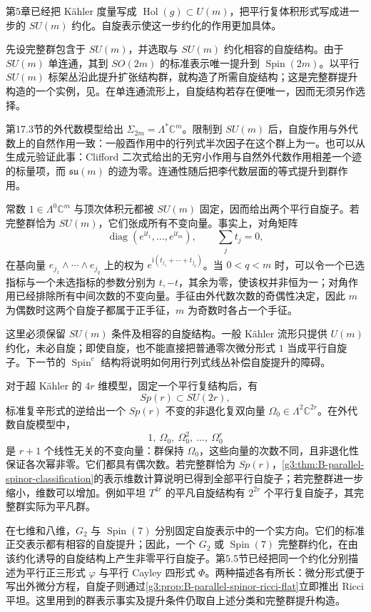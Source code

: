 第5章已经把 Kähler 度量写成 \(\operatorname{Hol}(g)\subset U(m)\)，把平行复体积形式写成进一步的 \(SU(m)\) 约化。自旋表示使这一步约化的作用更加具体。

先设完整群包含于 \(SU(m)\)，并选取与 \(SU(m)\) 约化相容的自旋结构。由于 \(SU(m)\) 单连通，其到 \(SO(2m)\) 的标准表示唯一提升到 \(\operatorname{Spin}(2m)\)。以平行 \(SU(m)\) 标架丛沿此提升扩张结构群，就构造了所需自旋结构；这是完整群提升构造的一个实例，见\cite[作者版本第5页，引理5]{MoroianuSemmelmann2000ParallelSpinors}。在单连通流形上，自旋结构若存在便唯一，因而无须另作选择。

第17.3节的外代数模型给出 \(\Sigma_{2m}=\Lambda^*\mathbb C^m\)。限制到 \(SU(m)\) 后，自旋作用与外代数上的自然作用一致：一般酉作用中的行列式半次因子在这个群上为一。也可以从生成元验证此事：Clifford 二次式给出的无穷小作用与自然外代数作用相差一个迹的标量项，而 \(\mathfrak{su}(m)\) 的迹为零。连通性随后把李代数层面的等式提升到群作用。

常数 \(1\in\Lambda^0\mathbb C^m\) 与顶次体积元都被 \(SU(m)\) 固定，因而给出两个平行自旋子。若完整群恰为 \(SU(m)\)，它们张成所有不变向量。事实上，对角矩阵
\[
 \operatorname{diag}(e^{\mathrm it_1},\ldots,e^{\mathrm it_m}),
 \qquad \sum_jt_j=0,
\]
在基向量 \(e_{j_1}\wedge\cdots\wedge e_{j_q}\) 上的权为 \(e^{\mathrm i(t_{j_1}+\cdots+t_{j_q})}\)。当 \(0<q<m\) 时，可以令一个已选指标与一个未选指标的参数分别为 \(t,-t\)，其余为零，使该权并非恒为一；对角作用已经排除所有中间次数的不变向量。手征由外代数次数的奇偶性决定，因此 \(m\) 为偶数时这两个自旋子都属于正手征，\(m\) 为奇数时各占一个手征。

这里必须保留 \(SU(m)\) 条件及相容的自旋结构。一般 Kähler 流形只提供 \(U(m)\) 约化，未必自旋；即使自旋，也不能直接把普通零次微分形式 \(1\) 当成平行自旋子。下一节的 \(\operatorname{Spin}^c\) 结构将说明如何用行列式线丛补偿自旋提升的障碍。

对于超 Kähler 的 \(4r\) 维模型，固定一个平行复结构后，有
\[
 Sp(r)\subset SU(2r),
\]
标准复辛形式的逆给出一个 \(Sp(r)\) 不变的非退化复双向量 \(\Omega_0\in\Lambda^2\mathbb C^{2r}\)。在外代数自旋模型中，
\[
 1,\ \Omega_0,\ \Omega_0^2,\ \ldots,\ \Omega_0^r
\]
是 \(r+1\) 个线性无关的不变向量：群保持 \(\Omega_0\)，这些向量的次数不同，且非退化性保证各次幂非零。它们都具有偶次数。若完整群恰为 \(Sp(r)\)，\cref{g3:thm:B-parallel-spinor-classification}的表示维数计算说明已得到全部平行自旋子；若完整群进一步缩小，维数可以增加。例如平坦 \(T^{4r}\) 的平凡自旋结构有 \(2^{2r}\) 个平行复自旋子，其完整群实际为平凡群。

在七维和八维，\(G_2\) 与 \(\operatorname{Spin}(7)\) 分别固定自旋表示中的一个实方向。它们的标准正交表示都有相容的自旋提升；因此，一个 \(G_2\) 或 \(\operatorname{Spin}(7)\) 完整群约化，在由该约化诱导的自旋结构上产生非零平行自旋子。第5.5节已经把同一个约化分别描述为平行正三形式 \(\varphi\) 与平行 Cayley 四形式 \(\Phi\)。两种描述各有所长：微分形式便于写出外微分方程，自旋子则通过\cref{g3:prop:B-parallel-spinor-ricci-flat}立即推出 Ricci 平坦。这里用到的群表示事实及提升条件仍取自上述分类和完整群提升构造。

